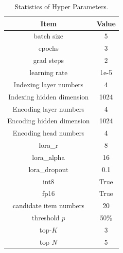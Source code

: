\begin{table}[htbp]
  \centering
  \caption{Statistics of Hyper Parameters.}
    \scalebox{0.8}
{
    \begin{tabular}{c|c}
    \toprule
    \toprule
    \multirow{1}{*}{Item}  & \multirow{1}{*}{Value}  \\
    \midrule
    batch size & 5  \\
    epochs  & 3  \\
    grad steps & 2 \\
    learning rate & 1e-5 \\
    \midrule
    Indexing layer numbers & 4  \\
    Indexing hidden dimension & 1024  \\
    Encoding layer numbers & 4  \\
    Encoding hidden dimension & 1024  \\
    Encoding head numbers & 4  \\
    \midrule
    lora\_r & 8 \\
    lora\_alpha & 16 \\
    lora\_dropout & 0.1 \\
    int8 & True \\
    fp16 & True \\
    \midrule
    candidate item numbers & 20\\
    threshold $p$ & 50\% \\
    top-$K$ & 3 \\
    top-$N$ & 5 \\
    \bottomrule
    \bottomrule
    \end{tabular}%
}
  \label{tab:hyper}%
\end{table}%